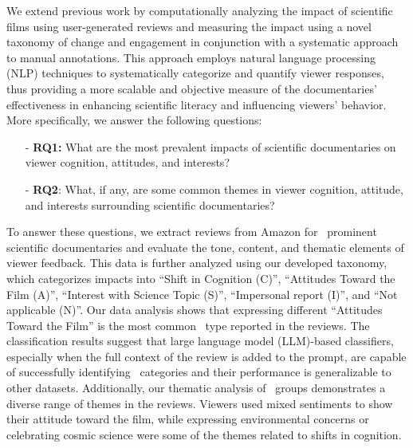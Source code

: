 We extend previous work by computationally analyzing the impact of scientific films using user-generated reviews and measuring the impact using a novel taxonomy of change and engagement in conjunction with a systematic approach to manual annotations. This approach employs natural language processing (NLP) techniques to systematically categorize and quantify viewer responses, thus providing a more scalable and objective measure of the documentaries' effectiveness in enhancing scientific literacy and influencing viewers' behavior. More specifically, we answer the following questions: 
    \begin{itemize}[noitemsep]
    \item[-] {\textbf{RQ1:}} What are the most prevalent impacts of scientific documentaries on viewer cognition, attitudes, and interests? 
    \item[-] {\textbf{RQ2}:} What, if any, are some common themes in viewer cognition, attitude, and interests surrounding scientific documentaries?
\end{itemize}

To answer these questions, we extract reviews from Amazon for \nmoviesword\ prominent scientific documentaries and evaluate the tone, content, and thematic elements of viewer feedback. This data is further analyzed using our developed taxonomy, which categorizes impacts into ``Shift in Cognition (C)'', ``Attitudes Toward the Film (A)'', ``Interest with Science Topic (S)'', ``Impersonal report (I)'', and ``Not applicable (N)''.
Our data analysis shows that expressing different ``Attitudes Toward the Film'' is the most common \impact\ type reported in the reviews. 
The classification results suggest that large language model (LLM)-based classifiers, especially when the full context of the review is added to the prompt, are capable of successfully identifying \impact\ categories and their performance is generalizable to other datasets. Additionally, our thematic analysis of \impact\ groups demonstrates a diverse range of themes in the reviews. Viewers %
used mixed sentiments to show their attitude toward the film, while expressing environmental concerns or celebrating cosmic science were some of the themes related to shifts in cognition. 

